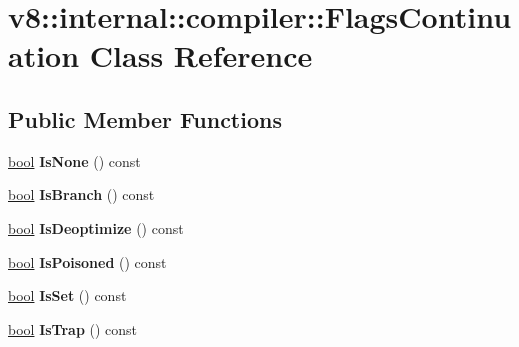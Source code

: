 \hypertarget{classv8_1_1internal_1_1compiler_1_1FlagsContinuation}{}\section{v8\+:\+:internal\+:\+:compiler\+:\+:Flags\+Continuation Class Reference}
\label{classv8_1_1internal_1_1compiler_1_1FlagsContinuation}
\subsection*{Public Member Functions}
\begin{DoxyCompactItemize}
\item 
\mbox{\label{classv8_1_1internal_1_1compiler_1_1FlagsContinuation_a8dc6f02095110fccac7ca3eb89de4019}} 
\mbox{\hyperlink{classbool}{bool}} {\bfseries Is\+None} () const
\item 
\mbox{\label{classv8_1_1internal_1_1compiler_1_1FlagsContinuation_a7aa3996fb10a4b0b785b42324770feca}} 
\mbox{\hyperlink{classbool}{bool}} {\bfseries Is\+Branch} () const
\item 
\mbox{\label{classv8_1_1internal_1_1compiler_1_1FlagsContinuation_ac73ca29cf7613885e83135d8b4fb0dc2}} 
\mbox{\hyperlink{classbool}{bool}} {\bfseries Is\+Deoptimize} () const
\item 
\mbox{\label{classv8_1_1internal_1_1compiler_1_1FlagsContinuation_abcf9e4079b6aaa9f63e5744c9e4a000c}} 
\mbox{\hyperlink{classbool}{bool}} {\bfseries Is\+Poisoned} () const
\item 
\mbox{\label{classv8_1_1internal_1_1compiler_1_1FlagsContinuation_a4d2fe146128e1266dc186db6749c3dd7}} 
\mbox{\hyperlink{classbool}{bool}} {\bfseries Is\+Set} () const
\item 
\mbox{\label{classv8_1_1internal_1_1compiler_1_1FlagsContinuation_ab3471b7232dc045b4d1aad8fc451e635}} 
\mbox{\hyperlink{classbool}{bool}} {\bfseries Is\+Trap} () const

\end{DoxyCompactItemize}
